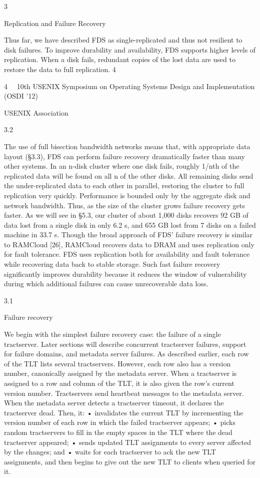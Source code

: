3

Replication and Failure Recovery

Thus far, we have described FDS as single-replicated
and thus not resilient to disk failures. To improve durability and availability, FDS supports higher levels of
replication. When a disk fails, redundant copies of the
lost data are used to restore the data to full replication.
4

4  10th USENIX Symposium on Operating Systems Design and Implementation (OSDI ’12)  

USENIX Association


3.2

The use of full bisection bandwidth networks means
that, with appropriate data layout (§3.3), FDS can perform failure recovery dramatically faster than many other
systems. In an n-disk cluster where one disk fails,
roughly 1/nth of the replicated data will be found on
all n of the other disks. All remaining disks send the
under-replicated data to each other in parallel, restoring
the cluster to full replication very quickly. Performance
is bounded only by the aggregate disk and network bandwidth. Thus, as the size of the cluster grows failure recovery gets faster. As we will see in §5.3, our cluster
of about 1,000 disks recovers 92 GB of data lost from a
single disk in only 6.2 s, and 655 GB lost from 7 disks on
a failed machine in 33.7 s. Though the broad approach
of FDS’ failure recovery is similar to RAMCloud [26],
RAMCloud recovers data to DRAM and uses replication only for fault tolerance. FDS uses replication both
for availability and fault tolerance while recovering data
back to stable storage. Such fast failure recovery significantly improves durability because it reduces the window of vulnerability during which additional failures can
cause unrecoverable data loss.

3.1

Failure recovery

We begin with the simplest failure recovery case: the
failure of a single tractserver. Later sections will describe concurrent tractserver failures, support for failure
domains, and metadata server failures.
As described earlier, each row of the TLT lists several
tractservers. However, each row also has a version number, canonically assigned by the metadata server. When
a tractserver is assigned to a row and column of the TLT,
it is also given the row’s current version number.
Tractservers send heartbeat messages to the metadata
server. When the metadata server detects a tractserver
timeout, it declares the tractserver dead. Then, it:
• invalidates the current TLT by incrementing the version number of each row in which the failed tractserver appears;
• picks random tractservers to fill in the empty spaces
in the TLT where the dead tractserver appeared;
• sends updated TLT assignments to every server affected by the changes; and
• waits for each tractserver to ack the new TLT assignments, and then begins to give out the new TLT
to clients when queried for it.

